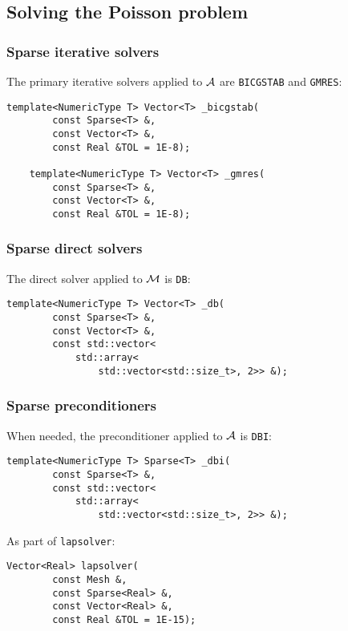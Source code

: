 \subsection{Solving the Poisson problem}

\begin{frame}[fragile]
    \frametitle{Sparse iterative solvers}

    The primary iterative solvers applied to $\mathcal{A}$ are \lstinline{BICGSTAB} and \lstinline{GMRES}:

    \begin{lstlisting}[style=cpp]
    template<NumericType T> Vector<T> _bicgstab(
        const Sparse<T> &, 
        const Vector<T> &, 
        const Real &TOL = 1E-8);
    
    template<NumericType T> Vector<T> _gmres(
        const Sparse<T> &, 
        const Vector<T> &, 
        const Real &TOL = 1E-8);
    \end{lstlisting}
\end{frame}

\begin{frame}[fragile]
    \frametitle{Sparse direct solvers}

    The direct solver applied to $\mathcal{M}$ is \lstinline{DB}:

    \begin{lstlisting}[style=cpp]
    template<NumericType T> Vector<T> _db(
        const Sparse<T> &, 
        const Vector<T> &, 
        const std::vector<
            std::array<
                std::vector<std::size_t>, 2>> &);
    \end{lstlisting}
\end{frame}

\begin{frame}[fragile]
    \frametitle{Sparse preconditioners}

    When needed, the preconditioner applied to $\mathcal{A}$ is \lstinline{DBI}:

    \begin{lstlisting}[style=cpp]
    template<NumericType T> Sparse<T> _dbi(
        const Sparse<T> &, 
        const std::vector<
            std::array<
                std::vector<std::size_t>, 2>> &);
    \end{lstlisting}

    As part of \lstinline{lapsolver}:

    \begin{lstlisting}[style=cpp]
    Vector<Real> lapsolver(
        const Mesh &, 
        const Sparse<Real> &, 
        const Vector<Real> &, 
        const Real &TOL = 1E-15);
    \end{lstlisting}
\end{frame}


